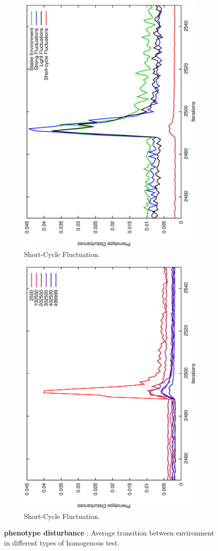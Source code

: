 \begin{figure}[H]
\begin{subfigure}{.25\textwidth}
  \centering
  \includegraphics[width=.7\linewidth, angle =-90]{img/Sucavg499999variationSmallb.eps}
  \caption{Short-Cycle Fluctuation.}
  \label{fig:transstest}
\end{subfigure}%
\begin{subfigure}{.25\textwidth}
  \centering
  \includegraphics[width=.7\linewidth, angle =-90]{img/SucavgvarSmallValidvariationSmallb.eps}
  \caption{Short-Cycle Fluctuation.}
  \label{fig:transonly}
\end{subfigure}
\caption{\textbf{phenotype disturbance} : Average transition between environment in different types of homogenous test.}
\label{fig:trans}
\end{figure}



